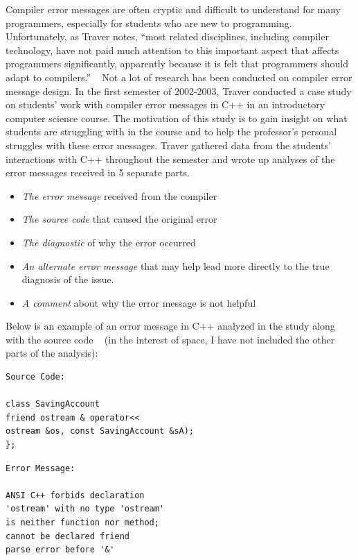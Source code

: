 \documentclass{sig-alternate}
\begin{document}

Compiler error messages are often cryptic and difficult to understand for many programmers, especially for students who are new to programming.
Unfortunately, as Traver notes, ``most related disciplines, including compiler technology, have not paid much attention to this important aspect that affects programmers significantly, apparently because it is felt that programmers should adapt to compilers.'' ~\cite{Traver:2010}
Not a lot of research has been conducted on compiler error message design.
In the first semester of 2002-2003, Traver conducted a case study on students' work with compiler error messages in C++ in an introductory computer science course.
The motivation of this study is to gain insight on what students are struggling with in the course and to help the professor's personal struggles with these error messages.
Traver gathered data from the students' interactions with C++ throughout the semester and wrote up analyses of the error messages received in 5 separate parts.
\begin{itemize}
	\item \textit{The error message} received from the compiler
	\item \textit{The source code} that caused the original error
	\item \textit{The diagnostic} of why the error occurred
	\item \textit{An alternate error message} that may help lead more directly to the true diagnosis of the issue.
	\item \textit{A comment} about why the error message is not helpful
\end{itemize}

Below is an example of an error message in C++ analyzed in the study along with the source code ~\cite{Traver:2010} (in the interest of space, I have not included the other parts of the analysis):

\begin{verbatim}
Source Code:

class SavingAccount 
friend ostream & operator<<
ostream &os, const SavingAccount &sA);
};
\end{verbatim}

\begin{verbatim}
Error Message:

ANSI C++ forbids declaration 
'ostream' with no type 'ostream'
is neither function nor method; 
cannot be declared friend
parse error before '&'
\end{verbatim}
\end{document}

